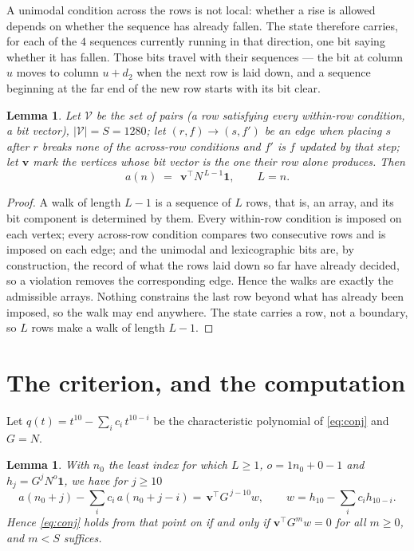 \documentclass[11pt,a4paper]{article}
\theoremstyle{plain}
\newtheorem{lemma}[theorem]{Lemma}
\theoremstyle{definition}
\begin{document}
A unimodal condition across the rows is not local: whether a
rise is allowed depends on whether the sequence has already fallen. The state therefore
carries, for each of the $4$ sequences currently running in that direction, one bit saying
whether it has fallen. Those bits travel with their sequences --- the bit at column $u$
moves to column $u+d_2$ when the next row is laid down, and a sequence beginning at the
far end of the new row starts with its bit clear.

\begin{lemma}\label{lem:walk}
Let $\mathcal V$ be the set of pairs (a row satisfying every within-row condition, a
bit vector), $|\mathcal V|=S=1280$; let $(r,f)\to(s,f')$ be an edge when placing $s$ after $r$
breaks none of the across-row conditions and $f'$ is $f$ updated by that step; let
$\mathbf{v}$ mark the vertices whose bit vector is the one their row alone produces.
Then
\[
a(n)\;=\;\,\mathbf{v}^{\!\top}N^{\,L-1}\mathbf{1},\qquad L=n.
\]
\end{lemma}

\begin{proof}
A walk of length $L-1$ is a sequence of $L$ rows, that is, an array, and its bit component
is determined by them. Every within-row condition is imposed on each vertex; every
across-row condition compares two consecutive rows and is imposed on each edge; and the
unimodal and lexicographic bits are, by construction, the record of what the rows laid down
so far have already decided, so a violation removes the corresponding edge. Hence the walks
are exactly the admissible arrays. Nothing constrains the last row beyond what has already
been imposed, so the walk may end anywhere. The state carries a row, not a boundary, so
$L$ rows make a walk of length $L-1$.
\end{proof}

\section{The criterion, and the computation}

Let $q(t)=t^{10}-\sum_i c_i\,t^{10-i}$ be the characteristic polynomial of
\eqref{eq:conj} and $G=N$.

\begin{lemma}\label{lem:crit}
With $n_0$ the least index for which $L\ge1$, $o=1n_0+0-1$ and
$h_j=G^{j}N^{o}\mathbf{1}$, we have for $j\ge10$
\[
a(n_0+j)-\sum_i c_i\,a(n_0+j-i)=\,\mathbf{v}^{\!\top}G^{\,j-10}w,
\qquad w=h_{10}-\sum_i c_ih_{10-i} .
\]
Hence \eqref{eq:conj} holds from that point on if and only if
$\mathbf{v}^{\!\top}G^{m}w=0$ for all $m\ge0$, and $m<S$ suffices.
\end{lemma}
\end{document}
